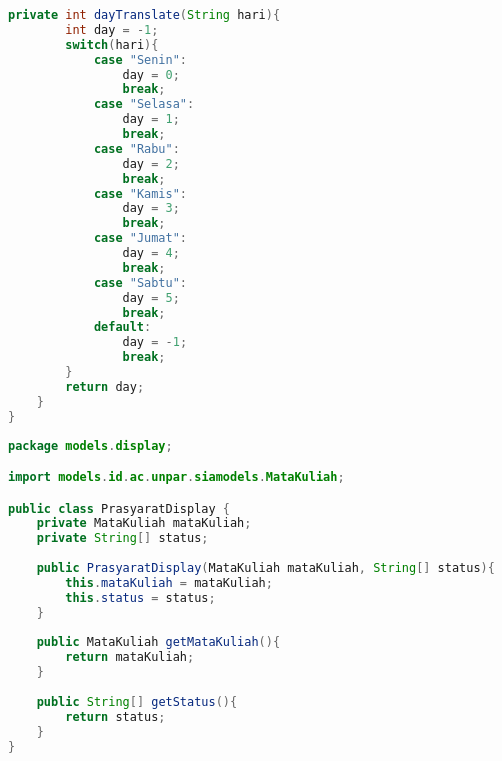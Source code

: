 \begin{lstlisting}[language=Java,basicstyle=\tiny,caption=JadwalDisplay.java]
	private int dayTranslate(String hari){
        int day = -1;
        switch(hari){
            case "Senin": 
                day = 0;
                break;
            case "Selasa": 
                day = 1;
                break;
            case "Rabu": 
                day = 2;
                break;
            case "Kamis": 
                day = 3;
                break;
            case "Jumat": 
                day = 4;
                break;
            case "Sabtu": 
                day = 5;
                break;
            default:
                day = -1;
                break;
        }
        return day;
    }
}
\end{lstlisting}

\singlespacing 
\begin{lstlisting}[language=Java,basicstyle=\tiny,caption=PrasyaratDisplay.java]
	package models.display;

import models.id.ac.unpar.siamodels.MataKuliah;

public class PrasyaratDisplay {
	private MataKuliah mataKuliah;
	private String[] status;
	
	public PrasyaratDisplay(MataKuliah mataKuliah, String[] status){
		this.mataKuliah = mataKuliah;
		this.status = status;
	}
	
	public MataKuliah getMataKuliah(){
		return mataKuliah;
	}
	
	public String[] getStatus(){
		return status;
	}
}
\end{lstlisting}

